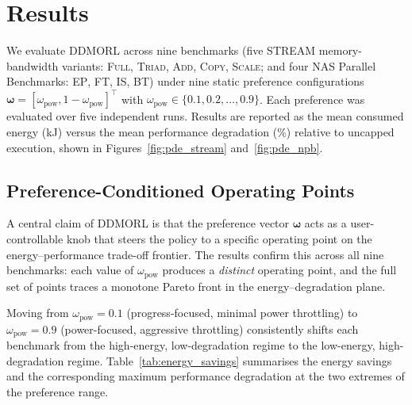 \section{Results}
\label{sec:results}

We evaluate DDMORL across nine benchmarks (five STREAM memory-bandwidth variants: \textsc{Full}, \textsc{Triad}, \textsc{Add}, \textsc{Copy}, \textsc{Scale}; and four NAS Parallel Benchmarks: \textsc{EP}, \textsc{FT}, \textsc{IS}, \textsc{BT}) under nine static preference configurations $\boldsymbol{\omega} = [\omega_\text{pow}, 1{-}\omega_\text{pow}]^\top$ with $\omega_\text{pow} \in \{0.1, 0.2, \ldots, 0.9\}$. Each preference was evaluated over five independent runs. Results are reported as the mean consumed energy (kJ) versus the mean performance degradation (\%) relative to uncapped execution, shown in Figures~\ref{fig:pde_stream} and~\ref{fig:pde_npb}.

\subsection{Preference-Conditioned Operating Points}

A central claim of DDMORL is that the preference vector $\boldsymbol{\omega}$ acts as a user-controllable knob that steers the policy to a specific operating point on the energy--performance trade-off frontier. The results confirm this across all nine benchmarks: each value of $\omega_\text{pow}$ produces a \emph{distinct} operating point, and the full set of points traces a monotone Pareto front in the energy--degradation plane.

Moving from $\omega_\text{pow} = 0.1$ (progress-focused, minimal power throttling) to $\omega_\text{pow} = 0.9$ (power-focused, aggressive throttling) consistently shifts each benchmark from the high-energy, low-degradation regime to the low-energy, high-degradation regime. Table~\ref{tab:energy_savings} summarises the energy savings and the corresponding maximum performance degradation at the two extremes of the preference range.

